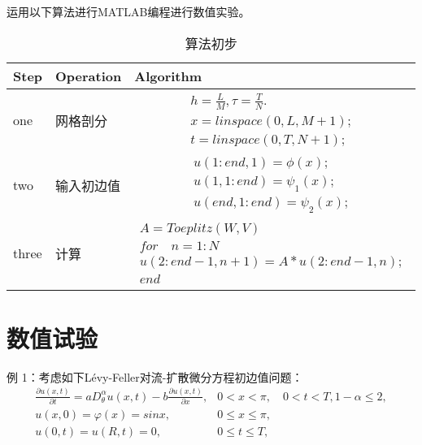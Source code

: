 运用以下算法进行MATLAB编程进行数值实验。
\begin{table}[h] %
	\caption{算法初步} %
	\begin{tabular}{p{2cm}|p{3.5cm}|p{8cm}} %
		\hline  
		\hline  
		Step & Operation & Algorithm \\ %
		\hline %
		one & 网格剖分 & \begin{equation*} 
		\begin{array}{ll}{h=\frac{L}{M},\tau=\frac{T}{N}.} \\ {x=linspace(0,L,M+1);} \\ {t=linspace(0,T,N+1);}\end{array}
		\end{equation*}\\  
		\hline  
		two & 输入初边值 & \begin{equation*} 
		\begin{array}{ll}{u(1:end,1)=\phi(x);} \\ {u(1,1:end)=\psi_{1}(x);} \\ {u(end,1:end)=\psi_{2}(x);}\end{array}
		\end{equation*}\\  
		\hline  
		three & 计算 & \begin{equation*} 
		\begin{array}{ll}{A=Toeplitz(W,V)}\\{for \quad n=1:N} \\ {u(2:end-1,n+1)=A*u(2:end-1,n);} \\ {end}\end{array}
		\end{equation*}\\  
		\hline   
		\hline  
	\end{tabular}  
\end{table}



\section{数值试验}


例 1：考虑如下Lévy-Feller对流-扩散微分方程初边值问题：
\begin{equation} 
\begin{array}{ll}{\frac{\partial u(x, t)}{\partial t}=a D_{\theta}^{\alpha} u(x, t)-b \frac{\partial u(x, t)}{\partial x},} & {0<x<\pi,\quad 0<t<T}, 1-\alpha \leq 2, \\ {u(x, 0)=\varphi(x)=sin x,} & {0 \leq x \leq \pi,} \\ {u(0, t)=u(R, t)=0,} & {0 \leq t \leq T,}\end{array}
\end{equation}

